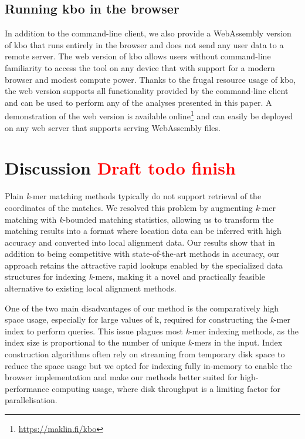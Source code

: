 \documentclass[unnumsec,webpdf,contemporary,large]{oup-authoring-template}%
\theoremstyle{thmstyleone}%
\theoremstyle{thmstyletwo}%
\theoremstyle{thmstylethree}%
\begin{document}
\subsection{Running kbo in the browser}
In addition to the command-line client, we also provide a WebAssembly version of {\sf kbo} that runs entirely in the browser and does not send any user data to a remote server. The web version of {\sf kbo} allows users without command-line familiarity to access the tool on any device that with support for a modern browser and modest compute power. Thanks to the frugal resource usage of {\sf kbo}, the web version supports all functionality provided by the command-line client and can be used to perform any of the analyses presented in this paper. A demonstration of the web version is available online\footnote{\url{https://maklin.fi/kbo}} and can easily be deployed on any web server that supports serving WebAssembly files.

\section{Discussion \textcolor{red}{Draft todo finish}}

Plain \emph{k}-mer matching methods typically do not support retrieval of the coordinates of the matches. We resolved this problem by augmenting \emph{k}-mer matching with \emph{k}-bounded matching statistics, allowing us to transform the matching results into a format where location data can be inferred with high accuracy and converted into local alignment data. Our results show that in addition to being competitive with state-of-the-art methods in accuracy, our approach retains the attractive rapid lookups enabled by the specialized data structures for indexing \emph{k}-mers, making it a novel and practically feasible alternative to existing local alignment methods.

One of the two main disadvantages of our method is the comparatively high space usage, especially for large values of k, required for constructing the \emph{k}-mer index to perform queries. This issue plagues most \emph{k}-mer indexing methods, as the index size is proportional to the number of unique \emph{k}-mers in the input. Index construction algorithms often rely on streaming from temporary disk space to reduce the space usage but we opted for indexing fully in-memory to enable the browser implementation and make our methods better suited for high-performance computing usage, where disk throughput is a limiting factor for parallelisation.
\end{document}

